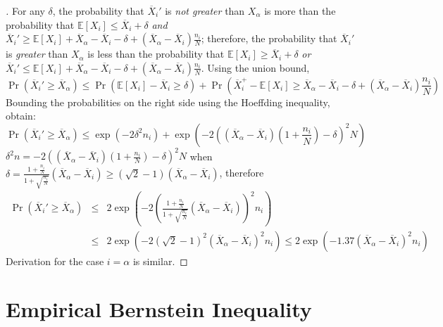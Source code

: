 \documentclass{article}
\newcommand {\IE} {\ensuremath {\mathbb{E}}}
\begin{document}
\begin{proof}[]
For any $\delta$, the probability that $\overline X_i'$ is \textit{not
greater} than
$X_\alpha$ is more than the probability that $\IE[X_i]\le\overline
X_i+\delta$ \textit{and} $\overline X_i'\ge \IE[X_i]+\overline X_\alpha - \overline
  X_i - \delta +(\overline X_\alpha - \overline X_i)\frac {n_i} N$;
therefore, the probability that $\overline X_i'$ is \textit{greater}
than $X_\alpha$ is less than the probability that $\IE[X_i]\ge\overline
X_i+\delta$ \textit{or} $\overline X_i'\le \IE[X_i]+\overline X_\alpha - \overline
  X_i - \delta +(\overline X_\alpha - \overline X_i)\frac {n_i} N$.
Using the union bound,
\begin{equation}
\Pr(\overline X_i'\ge \overline X_\alpha)\le
  \Pr(\IE[X_i]-\overline X_i \ge \delta) +
  \Pr(\overline X_i^+ - \IE[X_i] \ge \overline X_\alpha - \overline
  X_i - \delta +(\overline X_\alpha - \overline X_i)\frac {n_i} N)
\end{equation}
Bounding the probabilities on the right side using the Hoeffding
inequality, obtain:
\begin{equation}
\Pr(\overline X_i'\ge \overline X_\alpha)\le
  \exp(-2\delta^2n_i)+\exp\left(-2\left((\overline X_\alpha - \overline
  X_i)\left(1+\frac {n_i} N\right) - \delta\right)^2N\right)
\end{equation}
$\delta^2n = -2\left((\overline X_\alpha - \overline X_i)
(1+\frac {n_i} N) - \delta\right)^2N$ when
$\delta=\frac {1+\frac {n_i} N} {1+\sqrt {\frac {n_i} N}} (\overline X_\alpha
- \overline X_i) \ge (\sqrt 2 - 1)(\overline X_\alpha-\overline X_i)$,
therefore
\begin{eqnarray}
\Pr(\overline X_i'\ge \overline X_\alpha) 
& \le & 2\exp\left(-2\left( \frac {1+\frac {n_i} N} {1+\sqrt {\frac {n_i} N}}(\overline X_\alpha - \overline X_i)\right)^2 n_i\right)\nonumber \\
& \le & 2\exp(-2(\sqrt 2 - 1)^2(\overline X_\alpha - \overline X_i)^2n_i)
 \le 2\exp(-1.37(\overline X_\alpha - \overline X_i)^2n_i)
\end{eqnarray}
Derivation for the case $i=\alpha$ is similar.
\end{proof}

\section{Empirical Bernstein Inequality}
\label{app:deriv-conc-empbernstein}
\end{document}
